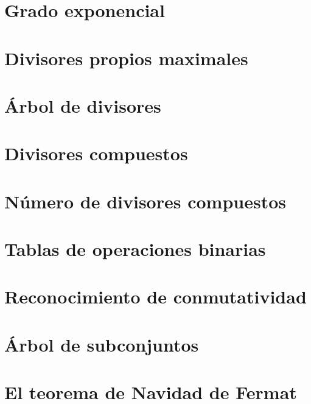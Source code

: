 \documentclass[a4paper,12pt,twoside]{book}
\begin{document}
\chapter{Grado exponencial}
\label{191218}

\chapter{Divisores propios maximales}
\label{201218}

\chapter{Árbol de divisores}
\label{211218}


\chapter{Divisores compuestos}
\label{181224}

\chapter{Número de divisores compuestos}
\label{181225}

\chapter{Tablas de operaciones binarias}
\label{181226}

\chapter{Reconocimiento de conmutatividad}
\label{181227}

\chapter{Árbol de subconjuntos}
\label{181228}


\chapter{El teorema de Navidad de Fermat}
\label{181231}
\end{document}

